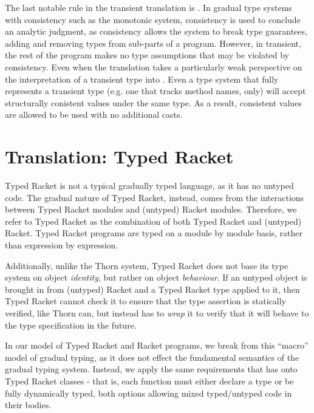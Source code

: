 \documentclass[a4paper,USenglish]{tex/lipics-v2016}
\begin{document}
\begin{mathpar}

\end{mathpar}

The last notable rule in the transient translation is . In gradual type systems with consistency such as the monotonic system, 
consistency is used to conclude an analytic judgment, as consistency allows the system to break type guarantees, adding and removing types from sub-parts of a program.
However, in transient, the rest of the program makes no type assumptions that may be violated by consistency. Even when the 
translation takes a particularly weak perspective on the interpretation of a transient type into \kafka. Even a type system that
fully represents a transient type (e.g. one that tracks method names, only) will accept structurally conistent values under the 
same type. As a result, consistent values are allowed to be used with no additional casts.

\section{Translation: Typed Racket}


Typed Racket is not a typical gradually typed language, as it has no untyped code.
The gradual nature of Typed Racket, instead, comes from the interactions between Typed Racket modules and 
(untyped) Racket modules. Therefore, we refer to Typed Racket as the combination of both 
Typed Racket and (untyped) Racket. Typed Racket programs are typed on a module by module basis, 
rather than expression by expression.

Additionally, unlike the Thorn system, Typed Racket does not base its type 
system on object \emph{identity}, but rather on object \emph{behaviour}. If an 
untyped object is brought in from (untyped) Racket and a Typed Racket type 
applied to it, then Typed Racket cannot check it to ensure that the type 
assertion is statically verified, like Thorn can, but instead has to \emph{wrap}
it to verify that it will behave to the type specification in the future.

In our model of Typed Racket and Racket programs, we break from this ``macro''
model of gradual typing, as it does not effect the fundamental semantics of the
gradual typing system. Instead, we apply the same requirements that \kafka has
onto Typed Racket classes - that is, each function must either declare a type
or be fully dynamically typed, both options allowing mixed typed/untyped code
in their bodies.
\end{document}
